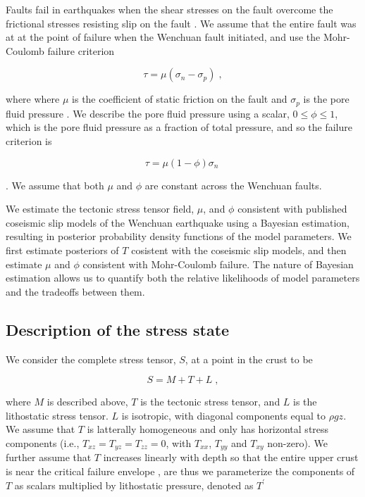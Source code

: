 \documentclass[twocolumn,jgrga]{AGUTeX}
\begin{document}
\begin{article}
Faults fail in earthquakes when the shear stresses on the fault overcome
the frictional stresses resisting slip on the fault \citep[e.g.,][]
{scholz2002}. We assume that the entire fault was at at the point of
failure when the Wenchuan fault initiated, and use the Mohr-Coulomb
failure criterion

\begin{equation} 
\tau = \mu ( \sigma_n - \sigma_p ) \; ,
\label{eqn:amonton_raw} 
\end{equation}

where where $\mu$ is the coefficient of static friction on the fault and
$\sigma_p$ is the pore fluid pressure \citep[e.g.,][]{sibson1985}. We
describe the pore fluid pressure using a scalar, $0 \leq \phi \leq 1$,
which is the pore fluid pressure as a fraction of total pressure, and so
the failure criterion is

\begin{equation} 
\tau = \mu (1 - \phi) \sigma_n \; 
\label{eqn:amonton} 
\end{equation}

\citep[e.g.,][]{sibson1985}. We assume that both $\mu$ and $\phi$ are
constant across the Wenchuan faults.

We estimate the tectonic stress tensor field, $\mu$, and $\phi$
consistent with published coseismic slip models of the Wenchuan
earthquake using a Bayesian estimation, resulting in posterior probability 
density functions of the model parameters. 
We first estimate posteriors of $T$ cosistent with
the coseismic slip models, and then estimate $\mu$ and $\phi$ consistent
with Mohr-Coulomb failure. The nature of Bayesian estimation allows us
to quantify both the relative likelihoods of model parameters and the
tradeoffs between them.

\subsection{Description of the stress
state}\label{description-of-the-stress-state}

We consider the complete stress tensor, $S$, at a point in the crust to
be

\begin{equation}
S = M + T + L \; ,
\end{equation}

where $M$ is described above, $T$ is the tectonic stress tensor, and $L$
is the lithostatic stress tensor. $L$ is isotropic, with diagonal
components equal to $\rho g z$. We assume that $T$ is latterally
homogeneous and only has horizontal stress components (i.e.,
$T_{xz} = T_{yz} = T_{zz} = 0$, with $T_{xx}$, $T_{yy}$ and $T_{xy}$
non-zero). We further assume that $T$ increases linearly with depth so
that the entire upper crust is near the critical failure envelope
\citep[e.g.,][]{townend2000}, are thus we parameterize the components of $T$
as scalars multiplied by lithostatic pressure, denoted as $T^\prime$


\end{article}
\end{document}
